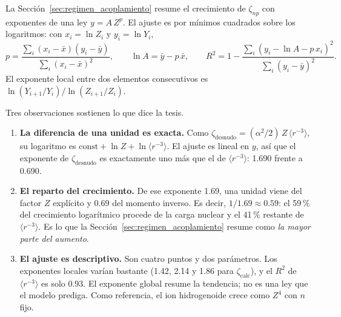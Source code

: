 \documentclass[11pt,a4paper]{article}
\begin{document}
La Sección~\ref{sec:regimen_acoplamiento} resume el crecimiento de $\zeta_{np}$ con exponentes
de una ley $y = A\,Z^p$. El ajuste es por mínimos cuadrados sobre los logaritmos: con
$x_i = \ln Z_i$ y $y_i = \ln Y_i$,
\begin{equation}
  p = \frac{\sum_i (x_i - \bar{x})(y_i - \bar{y})}{\sum_i (x_i - \bar{x})^2}, \qquad
  \ln A = \bar{y} - p\,\bar{x}, \qquad
  R^2 = 1 - \frac{\sum_i (y_i - \ln A - p\,x_i)^2}{\sum_i (y_i - \bar{y})^2}.
\end{equation}
El exponente local entre dos elementos consecutivos es
$\ln(Y_{i+1}/Y_i)/\ln(Z_{i+1}/Z_i)$.

\begin{table}[htbp]
  \centering\small
  
  \caption{Datos del ajuste: las tres $\zeta$ y $F^2$ en cm$^{-1}$, $\langle r^{-3}\rangle$ en
  $a_0^{-3}$.}
  \label{tab:det_pot_datos}
\end{table}

\begin{table}[htbp]
  \centering\small
  
  \caption{Exponente $p$, prefactor $A$ y $R^2$ del ajuste sobre los cuatro elementos, y
  exponentes locales entre elementos consecutivos.}
  \label{tab:det_pot_ajuste}
\end{table}

Tres observaciones sostienen lo que dice la tesis.

\begin{enumerate}
\item \textbf{La diferencia de una unidad es exacta.} Como
$\zeta_{\text{desnudo}} = (\alpha^2/2)\,Z\,\langle r^{-3}\rangle$, su logaritmo es
$\text{const} + \ln Z + \ln\langle r^{-3}\rangle$. El ajuste es lineal en $y$, así que el exponente
de $\zeta_{\text{desnudo}}$ es exactamente uno más que el de $\langle r^{-3}\rangle$: 1.690 frente a
0.690.
\item \textbf{El reparto del crecimiento.} De ese exponente 1.69, una unidad viene del factor $Z$
explícito y 0.69 del momento inverso. Es decir, $1/1.69 \approx 0.59$: el 59\,\% del crecimiento logarítmico
procede de la carga nuclear y el 41\,\% restante de $\langle r^{-3}\rangle$. Es lo que la Sección~\ref{sec:regimen_acoplamiento} resume como \emph{la mayor parte del aumento}.
\item \textbf{El ajuste es descriptivo.} Son cuatro puntos y dos parámetros. Los exponentes locales
varían bastante (1.42, 2.14 y 1.86 para $\zeta_{\text{calc}}$), y el $R^2$ de
$\langle r^{-3}\rangle$ es solo 0.93. El exponente global resume la tendencia; no es una ley que
el modelo prediga. Como referencia, el ion hidrogenoide crece como $Z^4$ con $n$ fijo.
\end{enumerate}
\end{document}
